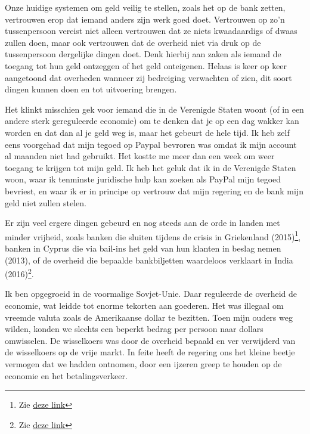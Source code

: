\documentclass[
  letterpaper,
]{scrbook}
\begin{document}
Onze huidige systemen om geld veilig te stellen, zoals het op de bank
zetten, vertrouwen erop dat iemand anders zijn werk goed doet.
Vertrouwen op zo'n tussenpersoon vereist niet alleen vertrouwen dat ze
niets kwaadaardigs of dwaas zullen doen, maar ook vertrouwen dat de
overheid niet via druk op de tussenpersoon dergelijke dingen doet. Denk
hierbij aan zaken als iemand de toegang tot hun geld ontzeggen of het
geld onteigenen. Helaas is keer op keer aangetoond dat overheden wanneer
zij bedreiging verwachten of zien, dit soort dingen kunnen doen en tot
uitvoering brengen.

Het klinkt misschien gek voor iemand die in de Verenigde Staten woont
(of in een andere sterk gereguleerde economie) om te denken dat je op
een dag wakker kan worden en dat dan al je geld weg is, maar het gebeurt
de hele tijd. Ik heb zelf eens voorgehad dat mijn tegoed op Paypal
bevroren was omdat ik mijn account al maanden niet had gebruikt. Het
kostte me meer dan een week om weer toegang te krijgen tot mijn geld. Ik
heb het geluk dat ik in de Verenigde Staten woon, waar ik tenminste
juridische hulp kan zoeken als PayPal mijn tegoed bevriest, en waar ik
er in principe op vertrouw dat mijn regering en de bank mijn geld niet
zullen stelen.

Er zijn veel ergere dingen gebeurd en nog steeds aan de orde in landen
met minder vrijheid, zoals banken die sluiten tijdens de crisis in
Griekenland (2015)\footnote{Zie
  \href{https://www.nbcnews.com/business/business-news/greece-crisis-banks-shut-week-restrictions-imposed-atms-n383606/}{deze
  link}}, banken in Cyprus die via bail-ins het geld van hun klanten in
beslag nemen (2013), of de overheid die bepaalde bankbiljetten
waardeloos verklaart in India (2016)\footnote{Zie
  \href{https://www.washingtonpost.com/world/asia_pacific/india-invalidates-large-bank-notes-in-crackdown-on-crime/2016/11/08/cc705ee2-a5c6-11e6-ba46-53db57f0e351_story.html}{deze
  link}}.

Ik ben opgegroeid in de voormalige Sovjet-Unie. Daar reguleerde de
overheid de economie, wat leidde tot enorme tekorten aan goederen. Het
was illegaal om vreemde valuta zoals de Amerikaanse dollar te bezitten.
Toen mijn ouders weg wilden, konden we slechts een beperkt bedrag per
persoon naar dollars omwisselen. De wisselkoers was door de overheid
bepaald en ver verwijderd van de wisselkoers op de vrije markt. In feite
heeft de regering ons het kleine beetje vermogen dat we hadden ontnomen,
door een ijzeren greep te houden op de economie en het betalingsverkeer.
\end{document}
